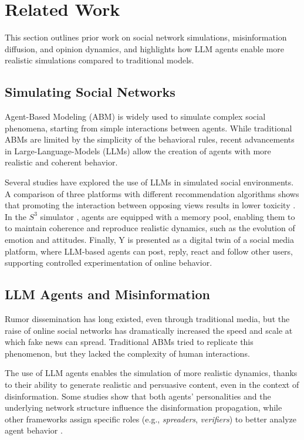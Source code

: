 \section{Related Work}
\label{sec:relatedwork}

This section outlines prior work on social network simulations, misinformation diffusion, and opinion dynamics, and highlights how LLM agents enable more realistic simulations compared to traditional models.

\subsection{Simulating Social Networks}
Agent-Based Modeling (ABM) is widely used to simulate complex social phenomena, starting from simple interactions between agents.
While traditional ABMs are limited by the simplicity of the behavioral rules, recent advancements in Large-Language-Models (LLMs) allow the creation of agents with more realistic and coherent behavior.

Several studies have explored the use of LLMs in simulated social environments.
A comparison of three platforms with different recommendation algorithms  shows that promoting the interaction between opposing views results in lower toxicity \cite{törnberg2023evaluate}.
In the $S^3$ simulator \cite{gao2023s3socialnetworksimulationlarge}, agents are equipped with a memory pool, enabling them to to maintain coherence and reproduce realistic dynamics, such as the evolution of emotion and attitudes.
Finally, Y \cite{rossetti2024ysocialllmpoweredsocial} is presented as a digital twin of a social media platform, where LLM-based agents can post, reply, react and follow other users, supporting controlled experimentation of online behavior.



\subsection{LLM Agents and Misinformation}
Rumor dissemination has long existed, even through traditional media, but the raise of online social networks has dramatically increased the speed and scale at which fake news can spread.
Traditional ABMs tried to replicate this phenomenon, but they lacked the complexity of human interactions.

The use of LLM agents enables the simulation of more realistic dynamics, thanks to their ability to generate realistic and persuasive content, even in the context of disinformation.
Some studies show that both agents' personalities and the underlying network structure influence the disinformation propagation, while other frameworks assign specific roles (e.g., \textit{spreaders}, \textit{verifiers}) to better analyze agent behavior \cite{liu2024tinyslipgiantleap}.



